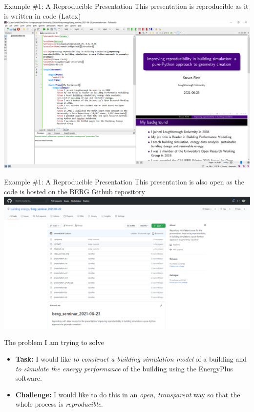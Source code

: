 \documentclass{beamer}
\begin{document}
	\begin{frame}{Example \#1: A Reproducible Presentation}
		This presentation is reproducible as it is written in code (Latex)\\[10pt]
		\includegraphics[width=\textwidth,keepaspectratio]{latex_example.png}
	\end{frame}
	
	\begin{frame}{Example \#1: A Reproducible Presentation}
		This presentation is also open as the code is hosted on the BERG Github repository\\[10pt]
		\includegraphics[width=\textwidth,keepaspectratio]{github_example.png}
	\end{frame}

	\begin{frame}{The problem I am trying to solve}
		\begin{itemize}
			\Large
			\item \textbf{Task:} I would like \emph{to construct a building simulation model} of a building and \emph{to simulate the energy performance} of the building using the EnergyPlus software.\\[10pt]
			\item \textbf{Challenge:} I would like to do this in an \emph{open, transparent} way so that the whole process is \emph{reproducible}. 
		\end{itemize}
	\end{frame}
\end{document}
